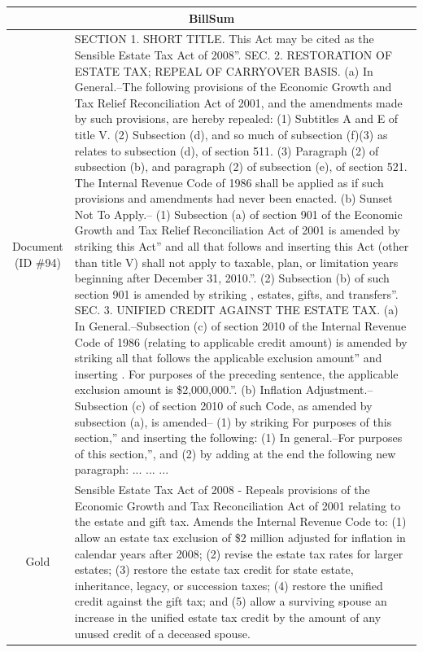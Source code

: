 \begin{table}[bth!]
\scriptsize
\centering
\renewcommand{\arraystretch}{1.3}
\begin{tabular}{c|p{}}
\hline
\multicolumn{2}{c}{BillSum} \\ \hline
\makecell{Document\\(ID \#94)} & 
SECTION 1. SHORT TITLE. This Act may be cited as the   Sensible Estate Tax Act of 2008''. SEC. 2. RESTORATION OF ESTATE TAX; REPEAL OF CARRYOVER BASIS. (a) In General.--The following provisions of the Economic Growth and Tax Relief Reconciliation Act of 2001, and the amendments made by such provisions, are hereby repealed: (1) Subtitles A and E of title V. (2) Subsection (d), and so much of subsection (f)(3) as relates to subsection (d), of section 511. (3) Paragraph (2) of subsection (b), and paragraph (2) of subsection (e), of section 521. The Internal Revenue Code of 1986 shall be applied as if such provisions and amendments had never been enacted. (b) Sunset Not To Apply.-- (1) Subsection (a) of section 901 of the Economic Growth and Tax Relief Reconciliation Act of 2001 is amended by striking   this Act'' and all that follows and inserting   this Act (other than title V) shall not apply to taxable, plan, or limitation years beginning after December 31, 2010.''. (2) Subsection (b) of such section 901 is amended by striking   , estates, gifts, and transfers''. SEC. 3. UNIFIED CREDIT AGAINST THE ESTATE TAX. (a) In General.--Subsection (c) of section 2010 of the Internal Revenue Code of 1986 (relating to applicable credit amount) is amended by striking all that follows   the applicable exclusion amount'' and inserting   . For purposes of the preceding sentence, the applicable exclusion amount is \$2,000,000.''. (b) Inflation Adjustment.--Subsection (c) of section 2010 of such Code, as amended by subsection (a), is amended-- (1) by striking   For purposes of this section,'' and inserting the following:   (1) In general.--For purposes of this section,'', and (2) by adding at the end the following new paragraph:   ... ... ... 
\\ \hline
Gold & 
Sensible Estate Tax Act of 2008 - Repeals provisions of the Economic Growth and Tax Reconciliation Act of 2001 relating to the estate and gift tax. Amends the Internal Revenue Code to: (1) allow an estate tax exclusion of \$2 million adjusted for inflation in calendar years after 2008; (2) revise the estate tax rates for larger estates; (3) restore the estate tax credit for state estate, inheritance, legacy, or succession taxes; (4) restore the unified credit against the gift tax; and (5) allow a surviving spouse an increase in the unified estate tax credit by the amount of any unused credit of a deceased spouse.

\end{tabular}
\end{table}
